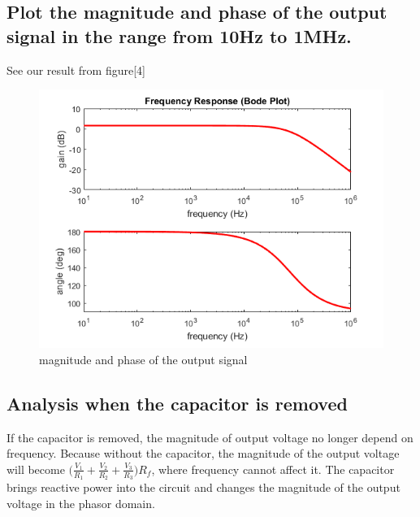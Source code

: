 \documentclass{IEEEtran}
\begin{document}
	\subsection{Plot the magnitude and phase of the output signal in the range from 10Hz to 1MHz.}
	See our result from figure[4]\\
	\begin{figure}
		\centering
		\label{fig:901}
		\begin{framed}
			\includegraphics[width=\linewidth]{images/9_1.PNG}
			\caption{magnitude and phase of the output signal}
		\end{framed}
	\end{figure}
	\subsection{Analysis when the capacitor is removed}
	If the capacitor is removed, the magnitude of output voltage no longer depend on frequency. Because without 
	the capacitor, the magnitude of the output voltage will become $\bigg(\frac{V_1}{R_1} + \frac{V_2}{R_2} + \frac{V_3}{R_3}\bigg)R_f$, where frequency cannot affect it. The capacitor brings reactive power into the circuit and changes the magnitude of the output voltage in the phasor domain.
\end{document}
